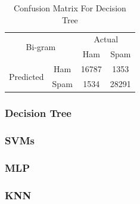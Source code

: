 \documentclass[12pt]{article}
\begin{document}
\begin{table}[H]
\begin{floatrow}
{\begin{subtable}{.45\textwidth}
								\begin{tabular}{@{}|c|c|c|c|@{}}
										\toprule
										\multicolumn{2}{|c|}{\multirow{2}{*}{Bi-gram}} & \multicolumn{2}{c|}{Actual} \\ \cmidrule(l){3-4} 
										\multicolumn{2}{|c|}{}                        & Ham          & Spam         \\ \midrule
										\multirow{2}{*}{Predicted}       & Ham        & 16787        & 1353         \\ \cmidrule(l){2-4} 
										& Spam       & 1534         & 28291        \\ \bottomrule
									\end{tabular}
							\end{subtable}
					}{  
						\caption{Confusion Matrix For Decision Tree}  
						\label{Confusion_DT}  
					}  
			\end{floatrow}
	\end{table} 


\subsubsection{Decision Tree}




\subsubsection{SVMs}


\subsubsection{MLP}



\subsubsection{KNN}

\end{document}
